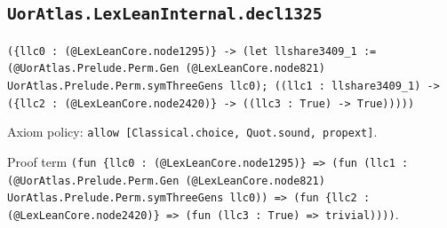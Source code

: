 \documentclass[11pt]{article}
\begin{document}
\subsection*{\texttt{UorAtlas.LexLeanInternal.decl1325}}
\noindent\texttt{(\{llc0 : (@LexLeanCore.node1295)\} -> (let llshare3409\_1 := (@UorAtlas.Prelude.Perm.Gen (@LexLeanCore.node821) UorAtlas.Prelude.Perm.symThreeGens llc0); ((llc1 : llshare3409\_1) -> (\{llc2 : (@LexLeanCore.node2420)\} -> ((llc3 : True) -> True)))))}\par
\noindent Axiom policy: \texttt{allow [Classical.choice, Quot.sound, propext]}.\par
\noindent Proof term \texttt{(fun \{llc0 : (@LexLeanCore.node1295)\} => (fun (llc1 : (@UorAtlas.Prelude.Perm.Gen (@LexLeanCore.node821) UorAtlas.Prelude.Perm.symThreeGens llc0)) => (fun \{llc2 : (@LexLeanCore.node2420)\} => (fun (llc3 : True) => trivial))))}.\par
\end{document}
